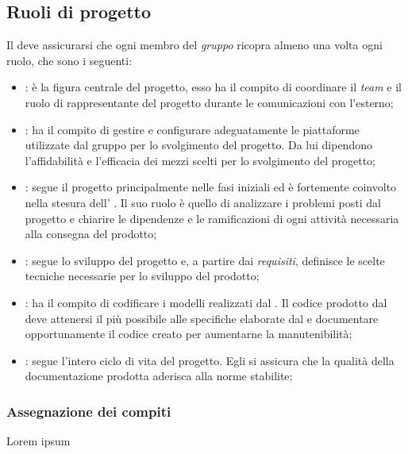 
\subsection{Ruoli di progetto}
Il \RdP{} deve assicurarsi che ogni membro del \emph{gruppo} ricopra almeno una volta ogni ruolo, che sono i seguenti:
	\begin{itemize}
		\item \textbf{\RdP}: è la figura centrale del progetto, esso ha il compito di coordinare il \emph{team} e il ruolo di rappresentante del progetto durante le comunicazioni con l'esterno;
		\item \textbf{\Amm}: ha il compito di gestire e configurare adeguatamente le piattaforme utilizzate dal gruppo per lo svolgimento del progetto. Da lui dipendono l'affidabilità e l'efficacia dei mezzi scelti per lo svolgimento del progetto;
		\item \textbf{\Ana}: segue il progetto principalmente nelle fasi iniziali ed è fortemente coinvolto nella stesura dell' \AdR{}. Il suo ruolo è quello di analizzare i problemi posti dal progetto e chiarire le dipendenze e le ramificazioni di ogni attività necessaria alla consegna del prodotto;
		\item \textbf{\Prog}: segue lo sviluppo del progetto e, a partire dai \emph{requisiti}, definisce le scelte tecniche necessarie per lo sviluppo del prodotto;
		\item \textbf{\Progm}: ha il compito di codificare i modelli realizzati dal \Prog{}. Il codice prodotto dal \Progm{} deve attenersi il più possibile alle specifiche elaborate dal \Prog{} e documentare opportunamente il codice creato per aumentarne la manutenibilità;
		\item \textbf{\Ver}: segue l'intero ciclo di vita del progetto. Egli si assicura che la qualità della documentazione prodotta aderisca alla norme stabilite;
	\end{itemize}

\subsubsection{Assegnazione dei compiti}
Lorem ipsum %